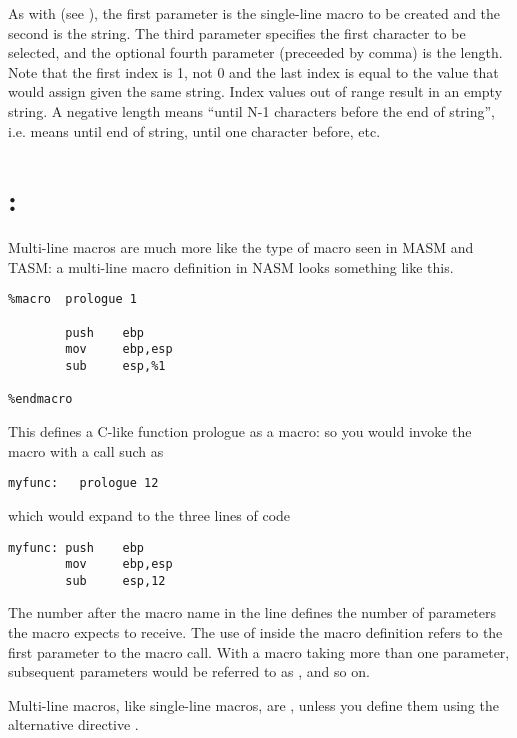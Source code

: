 As with  (see ), the first
parameter is the single-line macro to be created and the second
is the string. The third parameter specifies the first character
to be selected, and the optional fourth parameter (preceeded by comma)
is the length. Note that the first index is 1, not 0 and the last
index is equal to the value that  would assign given
the same string. Index values out of range result in an empty string.
A negative length means ``until N-1 characters before the end of string'',
i.e.  means until end of string,  until one character
before, etc.

\section{: }
\label{sec:mlmacro}

Multi-line macros are much more like the type of macro seen in MASM
and TASM: a multi-line macro definition in NASM looks something like
this.

\begin{lstlisting}
%macro  prologue 1

        push    ebp
        mov     ebp,esp
        sub     esp,%1

%endmacro
\end{lstlisting}

This defines a C-like function prologue as a macro: so you would
invoke the macro with a call such as

\begin{lstlisting}
myfunc:   prologue 12
\end{lstlisting}

which would expand to the three lines of code

\begin{lstlisting}
myfunc: push    ebp
        mov     ebp,esp
        sub     esp,12
\end{lstlisting}

The number  after the macro name in the  line
defines the number of parameters the macro  expects
to receive. The use of  inside the macro definition refers
to the first parameter to the macro call. With a macro taking more
than one parameter, subsequent parameters would be referred to as
,  and so on.

Multi-line macros, like single-line macros, are ,
unless you define them using the alternative directive .

